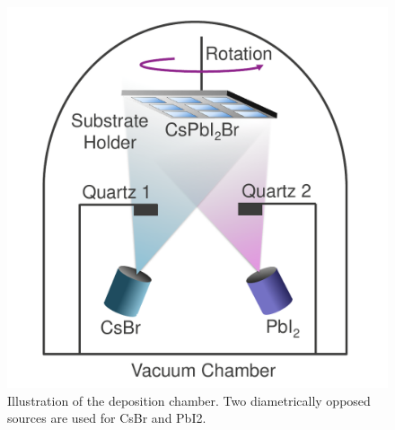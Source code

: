 \begin{figure}
  \centering
  \medskip
  \includegraphics[width=.5\textwidth]{chapters/material_properties/images/Chamber.pdf}
  \caption[Short caption for Table of Figures]{Illustration of the deposition chamber. Two diametrically opposed sources are used for CsBr and PbI2.}
  \label{fig:deposition_chamber}
\end{figure}


